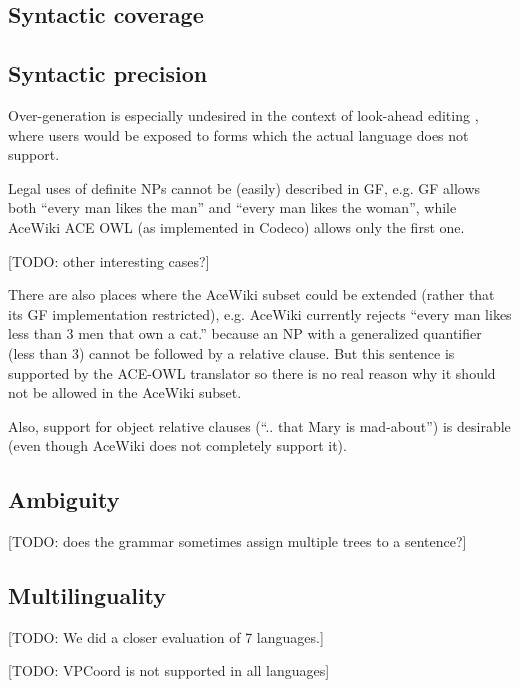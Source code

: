 \documentclass[a4paper]{article}
\begin{document}
\subsection{Syntactic coverage}


\subsection{Syntactic precision}

Over-generation is especially undesired in the context of look-ahead editing
\cite{schwitter:eamt-claw2003}, where users would be exposed to
forms which the actual language does not support.

Legal uses of definite NPs cannot be (easily) described in GF, e.g. GF
allows both ``every man likes the man'' and ``every man likes the woman'',
while AceWiki ACE OWL (as implemented in Codeco) allows only the
first one.

[TODO: other interesting cases?]

There are also
places where the AceWiki subset could be extended (rather that its GF
implementation restricted), e.g. AceWiki currently rejects ``every man
likes less than 3 men that own a cat.'' because an NP with a
generalized quantifier (less than 3) cannot be followed by a relative
clause. But this sentence is supported by the ACE-OWL translator
so there is no real reason why it should not be allowed in the
AceWiki subset.

Also, support for object relative clauses (``.. that Mary is mad-about'')
is desirable (even though AceWiki does not completely support it).


\subsection{Ambiguity}

[TODO: does the grammar sometimes assign multiple trees to a sentence?]

\subsection{Multilinguality}

[TODO: We did a closer evaluation of 7 languages.]

[TODO: VPCoord is not supported in all languages]
\end{document}
